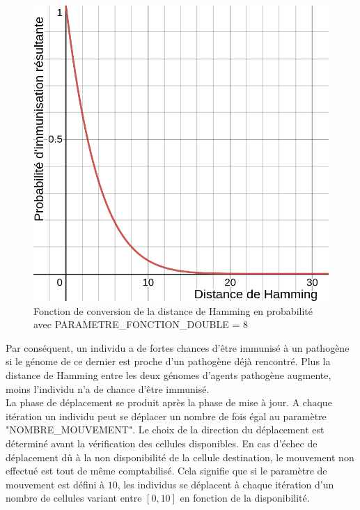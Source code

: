 \begin{figure}[h]
\begin{minipage}[b]{0.4\textwidth}
    \includegraphics[width=\textwidth]{Images/doubleHamming8.png}
    \caption[Fonction (double) de converstion en probabilité (facteur 8)]{Fonction de conversion de la distance de Hamming en probabilité avec {\tiny PARAMETRE\_FONCTION\_DOUBLE} = $8$}
  \end{minipage}
\end{figure}

Par conséquent, un individu a de fortes chances d'être immunisé à un pathogène si le génome de ce dernier est proche d'un pathogène déjà rencontré. Plus la distance de Hamming entre les deux génomes d'agents pathogène augmente, moins l'individu n'a de chance d'être immunisé.\\

La phase de déplacement se produit après la phase de mise à jour. A chaque itération un individu peut se déplacer un nombre de fois égal au paramètre {\small "NOMBRE\_MOUVEMENT"}. Le choix de la direction du déplacement est déterminé avant la vérification des cellules disponibles. En cas d'échec de déplacement dû à la non disponibilité de la cellule destination, le mouvement non effectué est tout de même comptabilisé. Cela signifie que si le paramètre de mouvement est défini à $10$, les individus se déplacent à chaque itération d'un nombre de cellules variant entre $[0,10]$ en fonction de la disponibilité.\\

